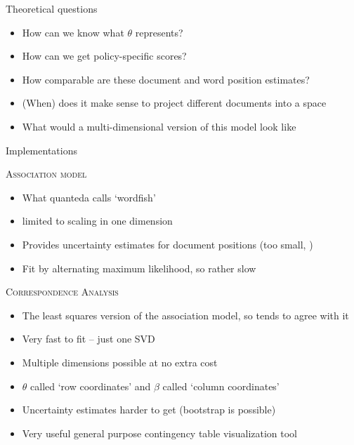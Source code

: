 \documentclass{hertieteaching}
\begin{document}
\begin{frame}{Theoretical questions}

\begin{itemize}
  \item How can we know what $\theta$ represents?
  \item How can we get policy-specific scores?
  \item How comparable are these document and word position estimates?
  \item (When) does it make sense to project different documents into a space
  \item What would a multi-dimensional version of this model look like
\end{itemize}

\end{frame}

\begin{frame}{Implementations}

\textsc{Association model}
\begin{itemize}
  \item What quanteda calls `wordfish'
  \item limited to scaling in one dimension
  \item Provides uncertainty estimates for document positions (too small, \cite{Lowe.Benoit2013})
  \item Fit by alternating maximum likelihood, so rather slow
\end{itemize}

\textsc{Correspondence Analysis}
\begin{itemize}
  \item The least squares version of the association model, so tends to agree with it
  \item Very fast to fit -- just one SVD
  \item Multiple dimensions possible at no extra cost
  \item $\theta$ called `row coordinates' and $\beta$ called `column coordinates'
  \item Uncertainty estimates harder to get (bootstrap is possible)
  \item Very useful general purpose contingency table visualization tool\end{itemize}
\end{frame}





%
\end{document}
